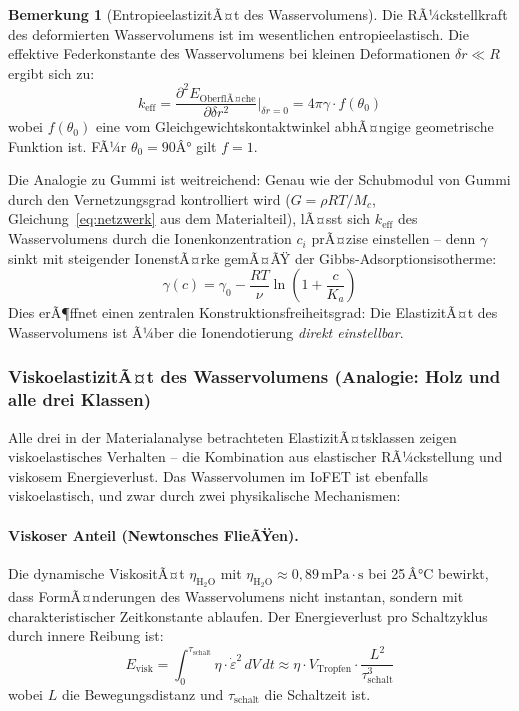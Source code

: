 ﻿\documentclass[a4paper,12pt]{scrreprt}
\theoremstyle{definition}
\newtheorem{bemerkung}{Bemerkung}[section]
\begin{document}
\begin{bemerkung}[EntropieelastizitÃ¤t des Wasservolumens]
	Die RÃ¼ckstellkraft des deformierten Wasservolumens ist im wesentlichen
	entropieelastisch. Die effektive Federkonstante des Wasservolumens bei
	kleinen Deformationen $\delta r \ll R$ ergibt sich zu:
	\begin{equation}
		k_{\mathrm{eff}} = \frac{\partial^2 E_{\mathrm{OberflÃ¤che}}}{\partial \delta r^2}
		\bigg|_{\delta r = 0}
		= 4\pi \gamma \cdot f(\theta_0)
		\label{eq:federkonst_wasser}
	\end{equation}
	wobei $f(\theta_0)$ eine vom Gleichgewichtskontaktwinkel abhÃ¤ngige
	geometrische Funktion ist. FÃ¼r $\theta_0 = 90Â°$ gilt $f = 1$.
\end{bemerkung}

Die Analogie zu Gummi ist weitreichend: Genau wie der Schubmodul von
Gummi durch den Vernetzungsgrad kontrolliert wird
($G = \rho R T / M_c$, Gleichung~\eqref{eq:netzwerk} aus dem
Materialteil), lÃ¤sst sich $k_{\mathrm{eff}}$ des Wasservolumens durch
die Ionenkonzentration $c_i$ prÃ¤zise einstellen -- denn $\gamma$
sinkt mit steigender IonenstÃ¤rke gemÃ¤ÃŸ der Gibbs-Adsorptionsisotherme:
\begin{equation}
	\gamma(c) = \gamma_0 - \frac{RT}{\nu} \ln\left(1 + \frac{c}{K_a}\right)
	\label{eq:gibbs_adsorption}
\end{equation}
Dies erÃ¶ffnet einen zentralen Konstruktionsfreiheitsgrad: Die ElastizitÃ¤t
des Wasservolumens ist Ã¼ber die Ionendotierung \emph{direkt einstellbar}.

\subsubsection{ViskoelastizitÃ¤t des Wasservolumens (Analogie: Holz und alle drei Klassen)}

Alle drei in der Materialanalyse betrachteten ElastizitÃ¤tsklassen zeigen
viskoelastisches Verhalten -- die Kombination aus elastischer RÃ¼ckstellung
und viskosem Energieverlust. Das Wasservolumen im IoFET ist ebenfalls
viskoelastisch, und zwar durch zwei physikalische Mechanismen:

\paragraph{Viskoser Anteil (Newtonsches FlieÃŸen).}
Die dynamische ViskositÃ¤t $\eta_{\mathrm{H_2O}}$ mit $\eta_{\mathrm{H_2O}} \approx 0{,}89\,\mathrm{mPa \cdot s}$
bei 25\,Â°C bewirkt, dass FormÃ¤nderungen des Wasservolumens nicht
instantan, sondern mit charakteristischer Zeitkonstante ablaufen. Der
Energieverlust pro Schaltzyklus durch innere Reibung ist:
\begin{equation}
	E_{\mathrm{visk}} = \int_0^{\tau_{\mathrm{schalt}}} \eta \cdot \dot{\varepsilon}^2 \, dV \, dt
	\approx \eta \cdot V_{\mathrm{Tropfen}} \cdot \frac{L^2}{\tau_{\mathrm{schalt}}^3}
	\label{eq:viskose_dissipation}
\end{equation}
wobei $L$ die Bewegungsdistanz und $\tau_{\mathrm{schalt}}$ die Schaltzeit ist.
\end{document}
